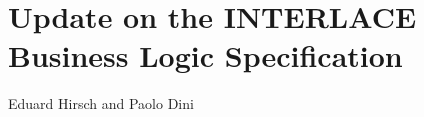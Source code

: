 \chapter{Update on the INTERLACE Business Logic Specification}
\label{ch:design}

\vspace{-1cm}
\begin{center}
Eduard Hirsch and Paolo Dini
\end{center}

